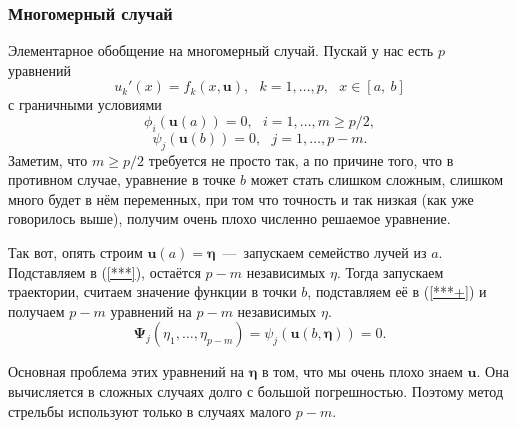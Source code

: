 \documentclass[a4,14pt,russian]{article}
\begin{document}
\subsubsection{Многомерный случай}
    Элементарное обобщение на многомерный случай. Пускай у нас есть $p$ уравнений
    \begin{equation}
     u_k'(x) = f_k(x, \boldsymbol u),\ \ \ k=1, \ldots,p,\ \ \ x \in [a,\ b]
    \end{equation}
    с граничными условиями
    \begin{equation}\label{***}
     \phi_i (\boldsymbol u(a)) = 0,\ \ \ i=1, \ldots,m \ge p/2,
    \end{equation}
    \begin{equation}\label{***+}
     \psi_j (\boldsymbol u(b)) = 0,\ \ \ j=1, \ldots,p-m.
    \end{equation}
    Заметим, что $m \ge p/2$ требуется не просто так, а по причине того, что в противном случае, уравнение в точке $b$ может стать слишком сложным, слишком много будет в нём переменных, при том что точность и так низкая (как уже говорилось выше), получим очень плохо численно решаемое уравнение.\par
    Так вот, опять строим $\boldsymbol u(a)=\boldsymbol \eta$~---~запускаем семейство лучей из $a$. Подставляем в (\ref{***}), остаётся $p-m$ независимых $\eta$. Тогда запускаем траектории, считаем значение функции в точки $b$, подставляем её в (\ref{***+}) и получаем $p-m$ уравнений на $p-m$ независимых $\eta$.
    \begin{equation}
     \boldsymbol \Psi_j(\eta_1,\ldots, \eta_{p-m})= \psi_j (\boldsymbol u(b, \boldsymbol \eta)) = 0.
    \end{equation}
    \par
    Основная проблема этих уравнений на $\boldsymbol \eta$ в том, что мы очень плохо знаем $\boldsymbol u$. Она вычисляется в сложных случаях долго с большой погрешностью. Поэтому метод стрельбы используют только в случаях малого $p-m$.
\end{document}
